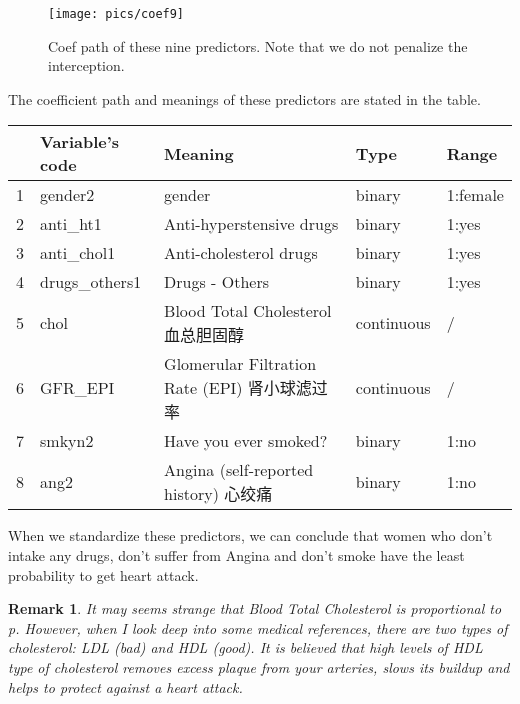 \documentclass[]{article}
\newtheorem{remark}{Remark}
\begin{document}
\begin{figure}
	\centering
	\texttt{[image: pics/coef9]}
	\caption{Coef path of these nine predictors. Note that we do not penalize the interception.}
	\label{fig:coef9}
\end{figure}


The coefficient path and meanings of these predictors are stated in the table.
\begin{table}[ht]
	\centering
	\begin{tabular}{rllll}
		\hline
		& Variable's code & Meaning & Type & Range \\ 
		\hline
		1 & gender2 & gender & binary & 1:female \\ 
		2 & anti\_ht1 & Anti-hyperstensive drugs & binary & 1:yes \\ 
		3 & anti\_chol1 & Anti-cholesterol drugs & binary & 1:yes \\ 
		4 & drugs\_others1 & Drugs - Others & binary & 1:yes \\ 
		5 & chol & Blood Total Cholesterol 血总胆固醇 & continuous & / \\ 
		6 & GFR\_EPI & Glomerular Filtration Rate (EPI) 肾小球滤过率 & continuous & / \\ 
		7 & smkyn2 & Have you ever smoked? & binary & 1:no \\ 
		8 & ang2 & Angina (self-reported history) 心绞痛 & binary & 1:no \\ 
		
		\hline
	\end{tabular}
\end{table}

When we standardize these predictors, we can conclude that women who don't intake any drugs, don't suffer from Angina and don't smoke have the least probability to get heart attack.
\begin{remark}
	It may seems strange that Blood Total Cholesterol is proportional to p. However, when I look deep into some medical references\cite{olson1997psyllium}, there are two types of cholesterol: LDL (bad) and HDL (good). It is believed that high levels of HDL type of cholesterol removes excess plaque from your arteries, slows its buildup and helps to protect against a heart attack.
\end{remark}
\end{document}
